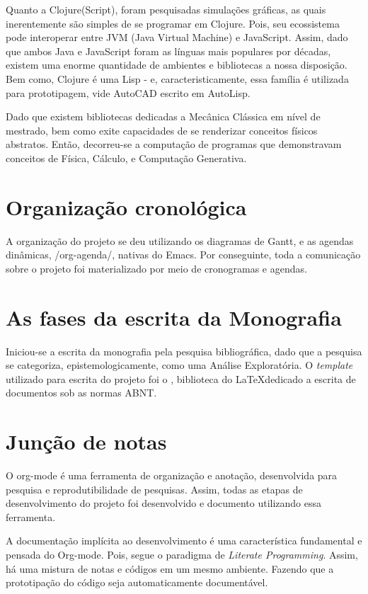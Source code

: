\documentclass[
12pt,				%
openright,			%
oneside,			%
a4paper,			%
english,			%
french,				%
spanish,			%
brazil,				%
]{abntex2}
\begin{document}
Quanto a Clojure(Script), foram pesquisadas simulações gráficas, as
quais inerentemente são simples de se programar em Clojure. Pois, seu
ecossistema pode interoperar entre JVM (Java Virtual Machine) e
JavaScript. Assim, dado que ambos Java e JavaScript foram as línguas
mais populares por décadas, existem uma enorme quantidade de ambientes
e bibliotecas a nossa disposição. Bem como, Clojure é uma Lisp - e,
caracteristicamente, essa família é utilizada para prototipagem, vide
AutoCAD escrito em AutoLisp.

Dado que existem bibliotecas dedicadas a Mecânica Clássica em nível de
mestrado, bem como exite capacidades de se renderizar conceitos
físicos abstratos. Então, decorreu-se a computação de programas que
demonstravam conceitos de Física, Cálculo, e Computação Generativa.


\section{Organização cronológica}

A organização do projeto se deu utilizando os diagramas de Gantt, e as
agendas dinâmicas, /org-agenda/, nativas do Emacs. Por conseguinte,
toda a comunicação sobre o projeto foi materializado por meio de
cronogramas e agendas.

\section{As fases da escrita da Monografia}
Iniciou-se a escrita da monografia pela pesquisa bibliográfica, dado
que a pesquisa se categoriza, epistemologicamente, como uma Análise
Exploratória. O \textit{template} utilizado para escrita do projeto
foi o \abnTeX{}, biblioteca do \LaTeX dedicado a escrita de documentos sob as normas ABNT.

\section{Junção de notas}
O org-mode é uma ferramenta de organização e anotação, desenvolvida
para pesquisa e reprodutibilidade de pesquisas. Assim, todas as etapas
de desenvolvimento do projeto foi desenvolvido e documento utilizando
essa ferramenta.

A documentação implícita ao desenvolvimento é uma
característica fundamental e pensada do Org-mode. Pois, segue o
paradigma de \textit{Literate Programming}. Assim, há uma mistura de
notas e códigos em um mesmo ambiente. Fazendo que a prototipação do
código seja automaticamente documentável.
\end{document}
